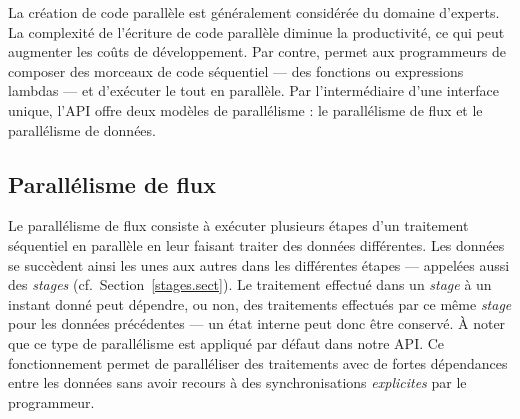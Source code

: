 La cr\'eation de code parall\`ele est g\'en\'eralement consid\'er\'ee du domaine d'experts. La complexit\'e de l'\'ecriture de code parall\`ele diminue la productivit\'e, ce qui peut augmenter les co\^uts de d\'eveloppement. Par contre,  permet aux programmeurs de composer des morceaux de code s\'equentiel --- des fonctions ou expressions lambdas --- et d'ex\'ecuter le tout en parall\`ele. Par l'interm\'ediaire d'une interface unique, l'API offre deux mod\`eles de parall\'elisme : le parall\'elisme de flux et le parall\'elisme de donn\'ees.






\subsection{Parall\'elisme de flux}

Le parall\'elisme de flux consiste \`a ex\'ecuter plusieurs \'etapes d'un traitement s\'equentiel en parall\`ele en leur faisant traiter des donn\'ees diff\'erentes. Les donn\'ees se succ\`edent ainsi les unes aux autres dans les diff\'erentes \'etapes --- appel\'ees  aussi des \emph{stages} (cf.~Section~\ref{stages.sect}).
%
Le traitement effectu\'e dans un \emph{stage} \`a un instant donn\'e peut d\'ependre, ou non, des traitements effectu\'es par ce m\^eme \emph{stage} pour les donn\'ees pr\'ec\'edentes --- un \'etat interne peut donc \^etre conserv\'e. 
%
\`A noter que ce type de parall\'elisme est appliqu\'e par d\'efaut dans notre API. 
%
Ce fonctionnement permet de parall\'eliser des traitements avec de fortes d\'ependances entre les donn\'ees sans avoir recours \`a des synchronisations \emph{explicites} par le programmeur. 


